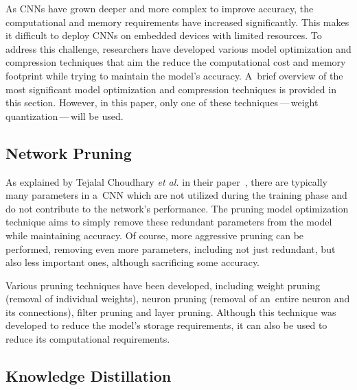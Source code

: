 As CNNs have grown deeper and more complex to improve accuracy, the
computational and memory requirements have increased significantly. This makes
it difficult to deploy CNNs on embedded devices with limited resources. To
address this challenge, researchers have developed various model optimization
and compression techniques that aim the reduce the computational cost and memory
footprint while trying to maintain the model's accuracy. A~brief overview of the
most significant model optimization and compression techniques is provided in
this section. However, in this paper, only one of these techniques\,---\,weight
quantization\,---\,will be used.


\subsection{Network Pruning}

As explained by Tejalal Choudhary \textit{et al.} in their
paper~\cite{Choudhary2020}, there are typically many parameters in a~CNN which
are not utilized during the training phase and do not contribute to the
network's performance. The pruning model optimization technique aims to simply
remove these redundant parameters from the model while maintaining accuracy. Of
course, more aggressive pruning can be performed, removing even more parameters,
including not just redundant, but also less important ones, although
sacrificing some accuracy.

Various pruning techniques have been developed, including weight pruning
(removal of individual weights), neuron pruning (removal of an~entire neuron and
its connections), filter pruning and layer pruning. Although this technique was
developed to reduce the model's storage requirements, it can also be used to
reduce its computational requirements.


\subsection{Knowledge Distillation}


